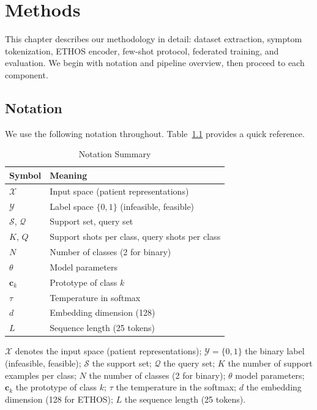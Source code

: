 \chapter{Methods}
\label{ch:methods}

This chapter describes our methodology in detail: dataset extraction, symptom tokenization, ETHOS encoder, few-shot protocol, federated training, and evaluation. We begin with notation and pipeline overview, then proceed to each component.

\section{Notation}

We use the following notation throughout. Table~\ref{tab:notation} provides a quick reference.

\begin{table}[htbp]
\centering
\caption{Notation Summary}
\small
\begin{tabular}{ll}
\toprule
\textbf{Symbol} & \textbf{Meaning} \\
\midrule
$\mathcal{X}$ & Input space (patient representations) \\
$\mathcal{Y}$ & Label space $\{0, 1\}$ (infeasible, feasible) \\
$\mathcal{S}$, $\mathcal{Q}$ & Support set, query set \\
$K$, $Q$ & Support shots per class, query shots per class \\
$N$ & Number of classes (2 for binary) \\
$\theta$ & Model parameters \\
$\mathbf{c}_k$ & Prototype of class $k$ \\
$\tau$ & Temperature in softmax \\
$d$ & Embedding dimension (128) \\
$L$ & Sequence length (25 tokens) \\
\bottomrule
\end{tabular}
\label{tab:notation}
\end{table}

$\mathcal{X}$ denotes the input space (patient representations); $\mathcal{Y} = \{0, 1\}$ the binary label (infeasible, feasible); $\mathcal{S}$ the support set; $\mathcal{Q}$ the query set; $K$ the number of support examples per class; $N$ the number of classes (2 for binary); $\theta$ model parameters; $\mathbf{c}_k$ the prototype of class $k$; $\tau$ the temperature in the softmax; $d$ the embedding dimension (128 for ETHOS); $L$ the sequence length (25 tokens).

